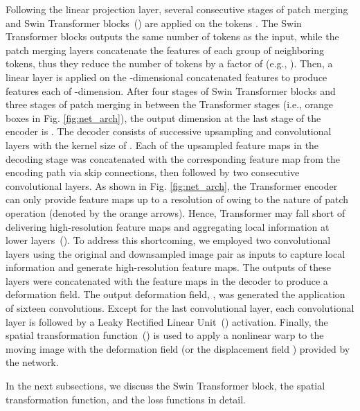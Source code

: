 \documentclass[times,twocolumn,final]{elsarticle}
\begin{document}
Following the linear projection layer, several consecutive stages of patch merging and Swin Transformer blocks~(\cite{liu2021swin}) are applied on the tokens . The Swin Transformer blocks outputs the same number of tokens as the input, while the patch merging layers concatenate the features of each group of  neighboring tokens, thus they reduce the number of tokens by a factor of  (e.g., ). Then, a linear layer is applied on the -dimensional concatenated features to produce features each of -dimension. After four stages of Swin Transformer blocks and three stages of patch merging in between the Transformer stages (i.e., orange boxes in Fig. \ref{fig:net_arch}), the output dimension at the last stage of the encoder is . The decoder consists of successive upsampling and convolutional layers with the kernel size of . Each of the upsampled feature maps in the decoding stage was concatenated with the corresponding feature map from the encoding path via skip connections, then followed by two consecutive convolutional layers. As shown in Fig. \ref{fig:net_arch}, the Transformer encoder can only provide feature maps up to a resolution of  owing to the nature of patch operation (denoted by the orange arrows). Hence, Transformer may fall short of delivering high-resolution feature maps and aggregating local information at lower layers~(\cite{raghu2021vision}). To address this shortcoming, we employed two convolutional layers using the original and downsampled image pair as inputs to capture local information and generate high-resolution feature maps. The outputs of these layers were concatenated with the feature maps in the decoder to produce a deformation field. The output deformation field, , was generated the application of sixteen  convolutions. Except for the last convolutional layer, each convolutional layer is followed by a Leaky Rectified Linear Unit~(\cite{maas2013rectifier}) activation. Finally, the spatial transformation function~(\cite{jaderberg2015spatial}) is used to apply a nonlinear warp to the moving image  with the deformation field  (or the displacement field ) provided by the network.

In the next subsections, we discuss the Swin Transformer block, the spatial transformation function, and the loss functions in detail.
\end{document}
